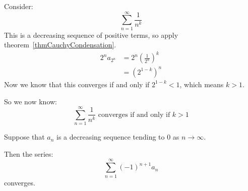 \documentclass[../Main.tex]{subfiles}
\begin{document}
\begin{example}
    Consider:
    \begin{equation*}
        \sum_{n=1}^\infty \frac{1}{n^k}
    \end{equation*}
    This is a decreasing sequence of positive terms, so apply theorem~\ref{thmCauchyCondensation}.
    \begin{align*}
        2^n a_{2^n} &= 2^n \left(\frac{1}{2^n}\right)^k \\
        &= \left(2^{1-k}\right)^n
    \end{align*}
    Now we know that this converges if and only if $2^{1-k} < 1$, which means $k > 1$.\par
    So we now know:
    \begin{equation}
        \sum_{n=1}^\infty \frac{1}{n^k} \text{ converges if and only if } k > 1
        \label{eqnSumOfPowerReciprocals}
    \end{equation}
\end{example}
\begin{theorem}
    Suppose that $a_n$ is a decreasing sequence tending to 0 as $n \to \infty$.\par
    Then the series:
    \begin{equation*}
        \sum_{n=1}^\infty (-1)^{n+1} a_n
    \end{equation*}
    converges.
    \label{thmAlternatingSeriesTest}
\end{theorem}
\end{document}
